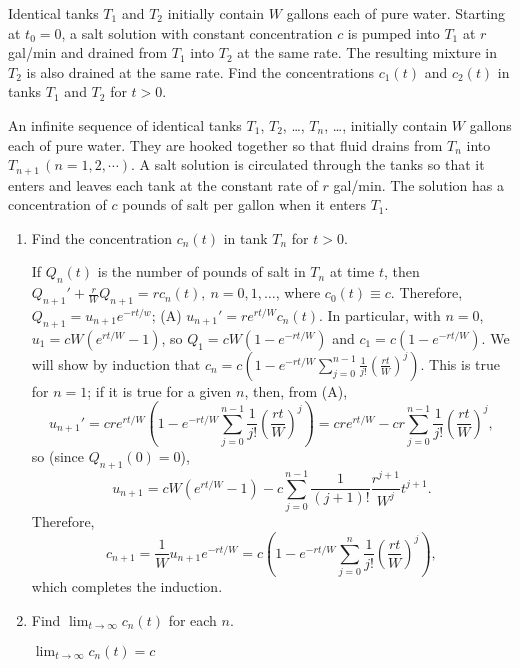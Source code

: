 \documentclass{ximera}
\begin{document}
\begin{problem}\label{exer:4.2.19}
Identical tanks $T_1$ and $T_2$ initially contain $W$ gallons each of
pure water. Starting at $t_0=0$, a salt solution with constant
concentration $c$ is pumped into $T_1$ at $r$ gal/min and drained from
$T_1$ into $T_2$ at the same rate. The resulting mixture in $T_2$ is
also drained at the same rate. Find the concentrations $c_1(t)$
and $c_2(t)$ in tanks $T_1$ and $T_2$ for $t>0$.
\end{problem}

\begin{problem}\label{exer:4.2.20}
An infinite sequence of identical tanks $T_1$, $T_2$, \dots, $T_n$, \dots,
initially contain $W$ gallons
each of pure water.  They are hooked together so that fluid drains
from $T_n$ into  $T_{n+1}\,(n=1,2,\cdots)$.
A salt solution is circulated through the tanks so that it enters and
leaves each tank at the constant rate of $r$ gal/min.
The solution has a concentration of
$c$  pounds of salt per
gallon when it enters $T_1$.

\begin{enumerate}
\item %
Find the concentration $c_n(t)$
in tank $T_n$ for $t>0$.

\begin{solution}
If $Q_n(t)$ is the number of pounds of salt in $T_n$ at time $t$, then
$Q_{n+1}'+\frac{r}{W}Q_{n+1}=rc_n(t),\ n=0,1,\dots$, where
$c_0(t)\equiv c$. Therefore,$Q_{n+1}=u_{n+1}e^{-rt/w}$;
(A) $u_{n+1}'=re^{rt/W}c_n(t)$. In particular, with $n=0$,
$u_1=cW(e^{rt/W}-1)$, so $Q_1=cW(1-e^{-rt/W})$  and
$c_1=c(1-e^{-rt/W})$. We will show by induction that
$c_n=c\left(1-e^{-rt/W}\sum_{j=0}^{n-1}\frac{1}{j!}\left(\frac{rt}{W}\right)^j\right)$.
 This is true for $n=1$; if it is
true for a given $n$, then, from (A),
$$
u_{n+1}'=cre^{rt/W}
\left(1-e^{-rt/W}\sum_{j=0}^{n-1}\frac{1}{j!}\left(\frac{rt}{W}\right)^j\right)
=cre^{rt/W}-cr
\sum_{j=0}^{n-1}\frac{1}{j!}\left(\frac{rt}{W}\right)^j,
$$
so (since $Q_{n+1}(0)=0$),
$$
u_{n+1}=cW(e^{rt/W}-1)-c\sum_{j=0}^{n-1}\frac{1}{(j+1)!}
\frac{r^{j+1}}{W^j}t^{j+1}.
$$
Therefore,
$$
c_{n+1}=\frac{1}{W}u_{n+1}e^{-rt/W}=
c\left(1-e^{-rt/W}\sum_{j=0}^n\frac{1}{j!}\left(\frac{rt}{W}\right)^j\right),
$$
which completes the induction.
\end{solution}

\item %
  Find $\lim_{t\to\infty}c_n(t)$ for each $n$.

\begin{solution}
$\lim_{t\to\infty}c_n(t)=c$
\end{solution}
\end{enumerate}
\end{problem}
\end{document}

